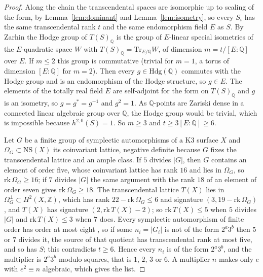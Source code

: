 \documentclass[11pt,reqno]{amsart}
\numberwithin{equation}{section}
\theoremstyle{plain}
\theoremstyle{definition}
\newcommand{\QQ}{\mathbb{Q}}
\newcommand{\ZZ}{\mathbb{Z}}
\newcommand{\NS}{\mathrm{NS}}
\begin{document}
\begin{proof}
Along the chain the transcendental spaces are isomorphic up to scaling of the form, by Lemma~\ref{lem:dominant} and Lemma~\ref{lem:isometry}, so every $S_{i}$ has the same transcendental rank $t$ and the same endomorphism field $E$ as $S$. By Zarhin \cite[Thms.~2.2.1 and 2.3.1]{Zar83} the Hodge group of $T(S)_{\QQ}$ is the group of $E$-linear special isometries of the $E$-quadratic space $W$ with $T(S)_{\QQ}=\mathrm{Tr}_{E/\QQ}W$, of dimension $m=t/[E:\QQ]$ over $E$. If $m\le2$ this group is commutative (trivial for $m=1$, a torus of dimension $[E:\QQ]$ for $m=2$). Then every $g\in\mathrm{Hdg}(\QQ)$ commutes with the Hodge group and is an endomorphism of the Hodge structure, so $g\in E$. The elements of the totally real field $E$ are self-adjoint for the form on $T(S)_{\QQ}$ and $g$ is an isometry, so $g=g^{*}=g^{-1}$ and $g^{2}=1$. As $\QQ$-points are Zariski dense in a connected linear algebraic group over $\QQ$, the Hodge group would be trivial, which is impossible because $h^{2,0}(S)=1$. So $m\ge3$ and $t\ge3[E:\QQ]\ge6$.

Let $G$ be a finite group of symplectic automorphisms of a K3 surface $X$ and $\Omega_{G}\subset\NS(X)$ its coinvariant lattice, negative definite because $G$ fixes the transcendental lattice and an ample class. If $5$ divides $|G|$, then $G$ contains an element of order five, whose coinvariant lattice has rank $16$ \cite[\S\,5]{Nik80b} and lies in $\Omega_{G}$, so $\mathrm{rk}\,\Omega_{G}\ge16$; if $7$ divides $|G|$ the same argument with the rank $18$ of an element of order seven gives $\mathrm{rk}\,\Omega_{G}\ge18$. The transcendental lattice $T(X)$ lies in $\Omega_{G}^{\perp}\subset H^{2}(X,\ZZ)$, which has rank $22-\mathrm{rk}\,\Omega_{G}\le6$ and signature $(3,19-\mathrm{rk}\,\Omega_{G})$, and $T(X)$ has signature $(2,\mathrm{rk}\,T(X)-2)$; so $\mathrm{rk}\,T(X)\le5$ when $5$ divides $|G|$ and $\mathrm{rk}\,T(X)\le3$ when $7$ does. Every symplectic automorphism of finite order has order at most eight \cite{Nik80b}, so if some $n_{i}=|G_{i}|$ is not of the form $2^{a}3^{b}$ then $5$ or $7$ divides it, the source of that quotient has transcendental rank at most five, and so has $S$; this contradicts $t\ge6$. Hence every $n_{i}$ is of the form $2^{a}3^{b}$, and the multiplier is $2^{a}3^{b}$ modulo squares, that is $1$, $2$, $3$ or $6$. A multiplier $n$ makes only $e$ with $e^{2}\equiv n$ algebraic, which gives the list.
\end{proof}
\end{document}
